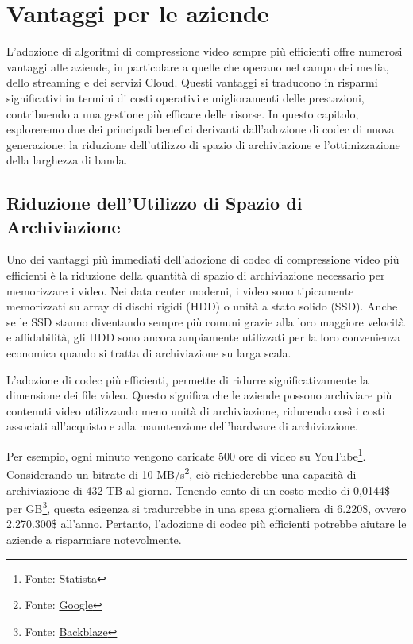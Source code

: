 \documentclass[a4paper,12pt, oneside]{article}
\begin{document}
\section{Vantaggi per le aziende}
L'adozione di algoritmi di compressione video sempre più efficienti offre numerosi vantaggi alle aziende,
in particolare a quelle che operano nel campo dei media, dello streaming e dei servizi Cloud. Questi
vantaggi si traducono in risparmi significativi in termini di costi operativi e miglioramenti delle
prestazioni, contribuendo a una gestione più efficace delle risorse. In questo capitolo, esploreremo due
dei principali benefici derivanti dall'adozione di codec di nuova generazione: la riduzione dell'utilizzo
di spazio di archiviazione e l'ottimizzazione della larghezza di banda.

\subsection{Riduzione dell'Utilizzo di Spazio di Archiviazione}
Uno dei vantaggi più immediati dell'adozione di codec di compressione video più efficienti è la riduzione
della quantità di spazio di archiviazione necessario per memorizzare i video. Nei data center moderni, i
video sono tipicamente memorizzati su array di dischi rigidi (HDD) o unità a stato solido (SSD). Anche se
le SSD stanno diventando sempre più comuni grazie alla loro maggiore velocità e affidabilità, gli HDD
sono ancora ampiamente utilizzati per la loro convenienza economica quando si tratta di archiviazione
su larga scala.

L'adozione di codec più efficienti, permette di ridurre significativamente la dimensione dei file video.
Questo significa che le aziende possono archiviare più contenuti video utilizzando meno unità di archiviazione,
riducendo così i costi associati all'acquisto e alla manutenzione dell'hardware di archiviazione.

Per esempio, ogni minuto vengono caricate 500 ore di video su YouTube\footnote{Fonte: \href{https://www.statista.com/statistics/259477/hours-of-video-uploaded-to-youtube-every-minute/}{Statista}}.
Considerando un bitrate di 10 MB/s\footnote{Fonte: \href{https://support.google.com/youtube/answer/2853702?hl=it}{Google}},
ciò richiederebbe una capacità di archiviazione di 432 TB al giorno. Tenendo conto di un costo medio di
0,0144\$ per GB\footnote{Fonte: \href{https://www.backblaze.com/blog/hard-drive-cost-per-gigabyte/}{Backblaze}},
questa esigenza si tradurrebbe in una spesa giornaliera di 6.220\$, ovvero 2.270.300\$ all'anno. Pertanto,
l'adozione di codec più efficienti potrebbe aiutare le aziende a risparmiare notevolmente.
\end{document}
